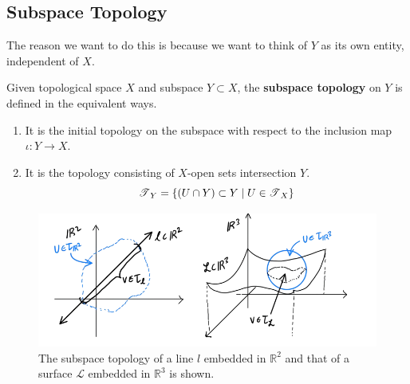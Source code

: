 \subsection{Subspace Topology} 

  The reason we want to do this is because we want to think of $Y$ as its own entity, independent of $X$. 

  \begin{definition}
    Given topological space $X$ and subspace $Y \subset X$, the \textbf{subspace topology} on $Y$ is defined in the equivalent ways. 
    \begin{enumerate}
      \item It is the initial topology on the subspace with respect to the inclusion map $\iota: Y \rightarrow X$. 
      \item It is the topology consisting of $X$-open sets intersection $Y$. 
      \begin{equation}
        \operatorname{\mathscr{T}}_Y = \{(U \cap Y) \subset Y \mid U \in \operatorname{\mathscr{T}}_X\}
      \end{equation}
    \end{enumerate}

    \begin{figure}[H]
      \centering 
      \includegraphics[scale=0.4]{img/Subspace_Topology.png}
      \caption{The subspace topology of a line $l$ embedded in $\mathbb{R}^2$ and that of a surface $\mathcal{L}$ embedded in $\mathbb{R}^3$ is shown.}
      \label{fig:subspace_topology}
    \end{figure} 
  \end{definition} 
